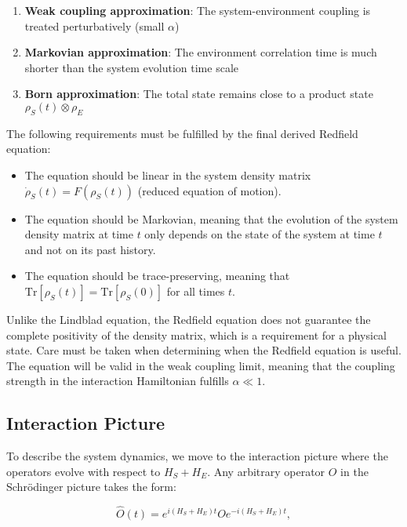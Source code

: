 \begin{enumerate}
	\item \textbf{Weak coupling approximation}: The system-environment coupling is treated perturbatively (small $\alpha$)
	\item \textbf{Markovian approximation}: The environment correlation time is much shorter than the system evolution time scale
	\item \textbf{Born approximation}: The total state remains close to a product state $\rho_S(t) \otimes \rho_E$
\end{enumerate}

The following requirements must be fulfilled by the final derived Redfield equation:

\begin{itemize}
	\item The equation should be linear in the system density matrix $\dot{\rho}_S(t) = F(\rho_S(t))$ (reduced equation of motion).
	\item The equation should be Markovian, meaning that the evolution of the system density matrix at time $t$ only depends on the state of the system at time $t$ and not on its past history.
	\item The equation should be trace-preserving, meaning that $\mathrm{Tr}[\rho_S(t)] = \mathrm{Tr}[\rho_S(0)]$ for all times $t$.
\end{itemize}

Unlike the Lindblad equation, the Redfield equation does not guarantee the complete positivity of the density matrix, which is a requirement for a physical state. Care must be taken when determining when the Redfield equation is useful. The equation will be valid in the weak coupling limit, meaning that the coupling strength in the interaction Hamiltonian fulfills $\alpha \ll 1$.

\subsection{Interaction Picture}

To describe the system dynamics, we move to the interaction picture where the operators evolve with respect to $H_S + H_E$. Any arbitrary operator $O$ in the Schrödinger picture takes the form:

\begin{equation}
	\hat{O}(t) = e^{i(H_S+H_E)t} O e^{-i(H_S+H_E)t},
	\label{eq:Interaction_Picture_Operators}
\end{equation}

